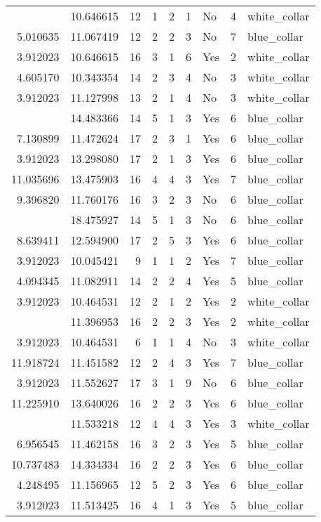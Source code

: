 \documentclass[
]{article}
\begin{document}
\begin{longtable}[t]{rrrrrllrl}
\addlinespace
6.659294 & 10.646615 & 12 & 1 & 2 & 1 & No & 4 & white\_collar\\
5.010635 & 11.067419 & 12 & 2 & 2 & 3 & No & 7 & blue\_collar\\
3.912023 & 10.646615 & 16 & 3 & 1 & 6 & Yes & 2 & white\_collar\\
4.605170 & 10.343354 & 14 & 2 & 3 & 4 & No & 3 & white\_collar\\
3.912023 & 11.127998 & 13 & 2 & 1 & 4 & No & 3 & white\_collar\\
\addlinespace
3.912023 & 14.483366 & 14 & 5 & 1 & 3 & Yes & 6 & blue\_collar\\
7.130899 & 11.472624 & 17 & 2 & 3 & 1 & Yes & 6 & blue\_collar\\
3.912023 & 13.298080 & 17 & 2 & 1 & 3 & Yes & 6 & blue\_collar\\
11.035696 & 13.475903 & 16 & 4 & 4 & 3 & Yes & 7 & blue\_collar\\
9.396820 & 11.760176 & 16 & 3 & 2 & 3 & No & 6 & blue\_collar\\
\addlinespace
3.912023 & 18.475927 & 14 & 5 & 1 & 3 & No & 6 & blue\_collar\\
8.639411 & 12.594900 & 17 & 2 & 5 & 3 & Yes & 6 & blue\_collar\\
3.912023 & 10.045421 & 9 & 1 & 1 & 2 & Yes & 7 & blue\_collar\\
4.094345 & 11.082911 & 14 & 2 & 2 & 4 & Yes & 5 & blue\_collar\\
3.912023 & 10.464531 & 12 & 2 & 1 & 2 & Yes & 2 & white\_collar\\
\addlinespace
8.993427 & 11.396953 & 16 & 2 & 2 & 3 & Yes & 2 & white\_collar\\
3.912023 & 10.464531 & 6 & 1 & 1 & 4 & No & 3 & white\_collar\\
11.918724 & 11.451582 & 12 & 2 & 4 & 3 & Yes & 7 & blue\_collar\\
3.912023 & 11.552627 & 17 & 3 & 1 & 9 & No & 6 & blue\_collar\\
11.225910 & 13.640026 & 16 & 2 & 2 & 3 & Yes & 6 & blue\_collar\\
\addlinespace
7.625595 & 11.533218 & 12 & 4 & 4 & 3 & Yes & 3 & white\_collar\\
6.956545 & 11.462158 & 16 & 3 & 2 & 3 & Yes & 5 & blue\_collar\\
10.737483 & 14.334334 & 16 & 2 & 2 & 3 & Yes & 6 & blue\_collar\\
4.248495 & 11.156965 & 12 & 5 & 2 & 3 & Yes & 6 & blue\_collar\\
3.912023 & 11.513425 & 16 & 4 & 1 & 3 & Yes & 5 & blue\_collar\\

\end{longtable}
\end{document}

